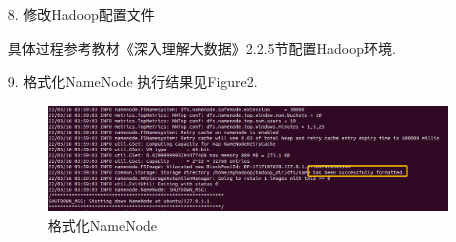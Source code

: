 \documentclass[a4paper,UTF8]{article}
\theoremstyle{definition}
\begin{document}
\begin{CJK}{UTF8}{gkai}
\begin{enumerate}
	\item[8.] 修改Hadoop配置文件
	\par 具体过程参考教材《深入理解大数据》2.2.5节配置Hadoop环境.
	\item[9.] 格式化NameNode
	执行结果见Figure2.
	\begin{figure}[h]
    \includegraphics[scale=0.65]{./namenode-format.png}
    \caption{格式化NameNode}
    \end{figure} 


\end{enumerate}
\end{CJK}
\end{document}
